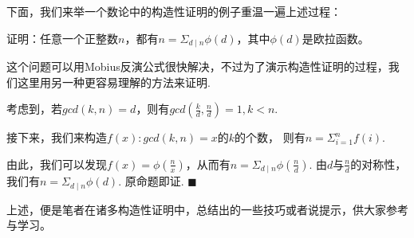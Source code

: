 \documentclass{Math_Note}
\begin{document}
下面，我们来举一个数论中的构造性证明的例子重温一遍上述过程：
\begin{prb}
    证明：任意一个正整数$n$，都有$n=\Sigma_{d\mid n}{\phi(d)}$，其中$\phi(d)$是欧拉函数。
\end{prb}
\begin{pf}
    这个问题可以用Mobius反演公式很快解决，不过为了演示构造性证明的过程，我们这里用另一种更容易理解的方法来证明.

    考虑到，若$gcd(k,n)=d$，则有$gcd(\frac{k}{d},\frac{n}{d})=1, k<n$.

    接下来，我们来构造$f(x): gcd(k,n)=x的k的个数$， 则有$n=\Sigma_{i=1}^{n}{f(i)}$.

    由此，我们可以发现$f(x)=\phi(\frac{n}{x})$，从而有$n=\Sigma_{d\mid n}{\phi(\frac{n}{d})}$. 
    由$d$与$\frac{n}{d}$的对称性，我们有$n=\Sigma_{d\mid n}{\phi(d)}$. 原命题即证. $\blacksquare$ %
\end{pf}

上述，便是笔者在诸多构造性证明中，总结出的一些技巧或者说提示，供大家参考与学习。
\end{document}

